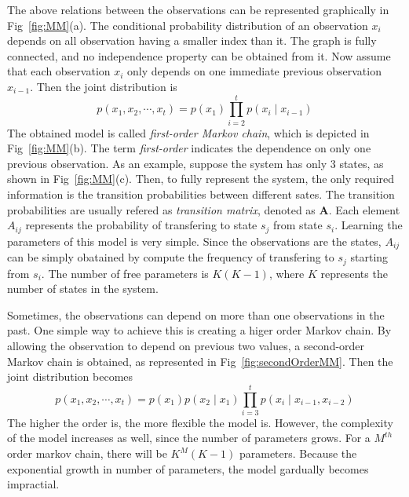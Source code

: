 The above relations between the observations can be represented graphically in Fig~\ref{fig:MM}(a). The conditional probability distribution of an observation \(x_i\) depends on all observation having a smaller index than it. The graph is fully connected, and no independence property can be obtained from it. Now assume that each observation \(x_i\) only depends on one immediate previous observation \(x_{i-1}\). Then the joint distribution is 
\begin{equation}
	p(x_1, x_2, \cdots, x_t) = p(x_1)\prod_{i = 2}^{t} p(x_i \mid x_{i-1})
\end{equation}
The obtained model is called \textit{first-order Markov chain}, which is depicted in Fig~\ref{fig:MM}(b). The term \textit{first-order} indicates the dependence on only one previous observation. As an example, suppose the system has only 3 states, as shown in Fig~\ref{fig:MM}(c). Then, to fully represent the system, the only required information is the transition probabilities between different sates. The transition probabilities are usually refered as \textit{transition matrix}, denoted as \(\mathbf{A}\). Each element \(A_{ij}\) represents the probability of transfering to state \(s_j\) from state \(s_i\). Learning the parameters of this model is very simple. Since the observations are the states, \(A_{ij}\) can be simply obatained by compute the frequency of transfering to \(s_j\) starting from \(s_i\). The number of free parameters is \(K(K-1)\), where \(K\) represents the number of states in the system.

Sometimes, the observations can depend on more than one observations in the past. One simple way to achieve this is creating a higer order Markov chain. By allowing the observation to depend on previous two values, a second-order Markov chain is obtained, as represented in Fig~\ref{fig:secondOrderMM}. Then the joint distribution becomes
\begin{equation}
	p(x_1, x_2, \cdots, x_t) = p(x_1)p(x_2 \mid x_1)\prod_{i = 3}^{t} p(x_i \mid x_{i-1}, x_{i-2})
\end{equation}
The higher the order is, the more flexible the model is. However, the complexity of the model increases as well, since the number of parameters grows. For a \(M^{th}\) order markov chain, there will be \(K^{M}(K-1)\) parameters. Because the exponential growth in number of parameters, the model gardually becomes impractial. 


